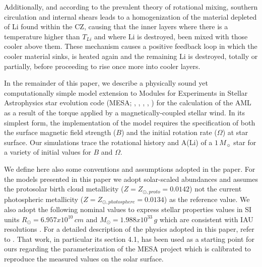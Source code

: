\documentclass[fleqn,usenatbib]{mnras}
\begin{document}
Additionally, and according to the prevalent theory of rotational mixing, southern circulation and internal shears leads to a homogenization of the material depleted of Li found within the CZ, causing that the inner layers where there is a temperature higher than $T_{Li}$ and where Li is destroyed, been mixed with those cooler above them. These mechanism causes a positive feedback loop in which the cooler material sinks, is heated again and the remaining Li is destroyed, totally or partially, before proceeding to rise once more into cooler layers. \par

In the remainder of this paper, we describe a physically sound yet computationally simple model extension to Modules for Experiments in Stellar Astrophysics star evolution code (MESA; \citeauthor{Paxton2011} \citeyear{Paxton2011}, \citeyear{Paxton2013}, \citeyear{Paxton2015}, \citeyear{Paxton2018}, \citeyear{Paxton2019}) for the calculation of the AML as a result of the torque applied by a magnetically-coupled stellar wind. In its simplest form, the implementation of the model requires the specification of both the surface magnetic field strength ($B$) and the initial  rotation rate ($\Omega$) at star surface. Our simulations trace the rotational history and A(Li) of a $1\, M_{\sun}$ star for a variety of initial values for $B$ and $\Omega$.\par

We define here also some conventions and assumptions adopted in the paper. For the models presented in this paper we adopt solar-scaled abundances and assumes the \citet{Asplund2009} protosolar birth cloud metallicity ($Z = Z_{\odot, proto} = 0.0142$) not the current photospheric metallicity ($Z = Z_{\odot, photosphere} = 0.0134$) as the reference value. We also adopt the following nominal values to express stellar properties values in SI units $R_{\odot} = 6.957x10^{10}\, cm$ and $M_{\odot} = 1.988x10^{33}\, g$ which are consistent with IAU resolutions \citep{Mamajek2015}. For a detailed description of the physics adopted in this paper, refer to \citet{Choi2016}. That work, in particular its section 4.1, has been used as a starting point for ours regarding the parameterization of the MESA project which is calibrated to reproduce the measured values on the solar surface.\par
\end{document}
